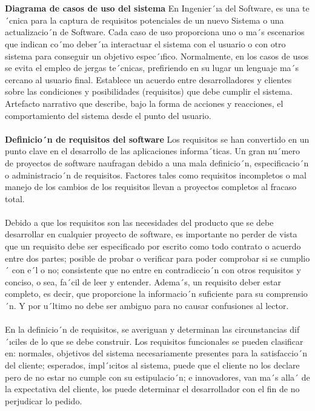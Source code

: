 \documentclass[conference,compsoc,onecolumn]{IEEEtran}
\begin{document}
\\
\\
\textbf{Diagrama  de  casos  de  uso  del  sistema} En  Ingenier´ıa  del  Software,  es  una  te´cnica  para  la  captura  de  requisitos potenciales de un nuevo Sistema o una actualizacio´n de Software. Cada caso de uso proporciona uno o ma´s escenarios que  indican  co´mo  deber´ıa  interactuar  el  sistema  con  el  usuario  o  con  otro  sistema  para  conseguir  un  objetivo espec´ıfico.  Normalmente,  en  los  casos  de  usos  se  evita  el  empleo  de  jergas  te´cnicas,  prefiriendo  en  su  lugar  un lenguaje ma´s cercano al usuario final. Establece un acuerdo entre desarrolladores y clientes sobre las condiciones y posibilidades (requisitos) que debe cumplir el sistema. Artefacto narrativo que describe, bajo la forma de acciones y reacciones, el comportamiento del sistema desde el punto del usuario.
\\
\\
\textbf{Definicio´n  de  requisitos  del  software} Los  requisitos  se  han  convertido  en  un  punto  clave  en  el  desarrollo  de las  aplicaciones  informa´ticas.  Un  gran  nu´mero  de  proyectos  de  software  naufragan  debido  a  una  mala  definicio´n, especificacio´n  o  administracio´n  de  requisitos.  Factores  tales  como  requisitos  incompletos  o  mal  manejo  de  los cambios de los requisitos llevan a proyectos completos al fracaso total.
\\
\\
Debido a que los requisitos son las necesidades del producto que se debe desarrollar en cualquier proyecto de software, es importante no perder de vista que un requisito debe ser especificado por escrito como todo contrato o acuerdo entre dos partes; posible de probar o verificar para poder comprobar si se cumplio´  con e´l o no; consistente que no entre en contradiccio´n con otros requisitos y conciso, o sea, fa´cil de leer y entender. Adema´s, un requisito deber  estar  completo,  es  decir,  que  proporcione  la  informacio´n  suficiente  para  su  comprensio´n.  Y  por  u´ltimo  no debe ser ambiguo para no causar confusiones al lector.
\\
\\
En  la  definicio´n  de  requisitos,  se  averiguan  y  determinan  las  circunstancias  dif´ıciles  de  lo  que  se  debe  construir. Los requisitos funcionales se pueden clasificar en: normales, objetivos del sistema necesariamente presentes para la  satisfaccio´n  del  cliente;  esperados,  impl´ıcitos  al  sistema,  puede  que  el  cliente  no  los  declare  pero  de  no  estar no  cumple  con  su  estipulacio´n;  e  innovadores,  van  ma´s  alla´  de  la  expectativa  del  cliente,  los  puede  determinar  el desarrollador con el fin de no perjudicar lo pedido.
\end{document}

